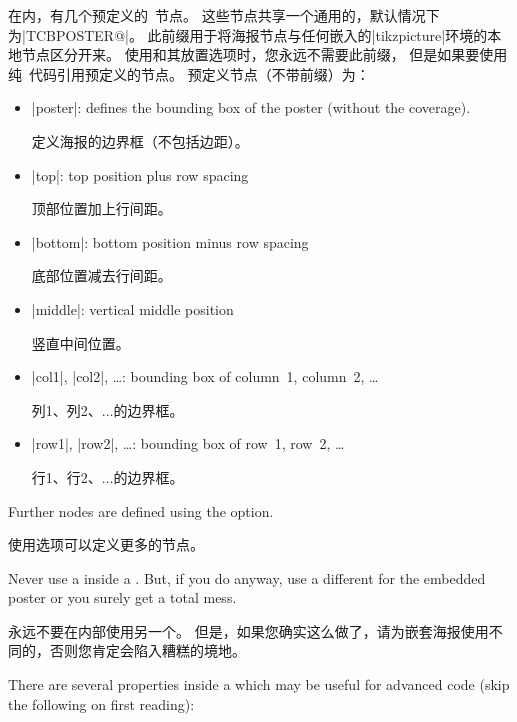 在内，有几个预定义的\tikzname\ 节点。
这些节点共享一个通用的，默认情况下为|TCBPOSTER@|。
此前缀用于将海报节点与任何嵌入的|tikzpicture|环境的本地节点区分开来。
使用和其放置选项时，您永远不需要此前缀，
但是如果要使用纯\tikzname\ 代码引用预定义的节点。
预定义节点（不带前缀）为：
\begin{itemize}
\item|poster|: defines the bounding box of the poster (without the coverage).

定义海报的边界框（不包括边距）。
\item|top|: top position plus row spacing

顶部位置加上行间距。
\item|bottom|: bottom position minus row spacing

底部位置减去行间距。
\item|middle|: vertical middle position

竖直中间位置。
\item|col1|, |col2|, \ldots: bounding box of column~1, column~2, \ldots

列1、列2、$\ldots$的边界框。
\item|row1|, |row2|, \ldots: bounding box of row~1, row~2, \ldots

行1、行2、$\ldots$的边界框。
\end{itemize}
Further nodes are defined using the  option.

使用选项可以定义更多的节点。
\begin{marker}
Never use a  inside a .
But, if you do anyway, use a different  for
the embedded poster or you surely get a total mess.

永远不要在内部使用另一个。
但是，如果您确实这么做了，请为嵌套海报使用不同的，否则您肯定会陷入糟糕的境地。
\end{marker}

There are several properties inside a  which may be useful
for advanced code (skip the following on first reading):

